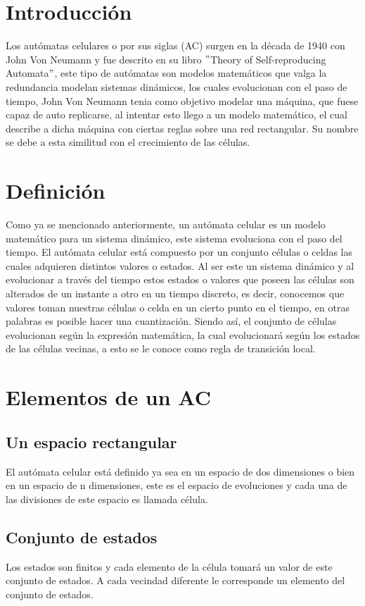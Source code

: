 \documentclass[11pt]{article}
\begin{document}
	\newpage
	
	\section{Introducción}
		Los autómatas celulares o por sus siglas (AC) surgen en la década de 1940 con John Von Neumann y fue  descrito en su libro $"$Theory of Self-reproducing Automata$"$, este tipo de autómatas son modelos matemáticos que valga la redundancia modelan sistemas dinámicos, los cuales evolucionan con el paso de tiempo, John Von Neumann tenia como objetivo modelar una máquina, que fuese capaz de auto replicarse, al intentar esto llego a un modelo matemático, el cual describe a dicha máquina con ciertas reglas sobre una red rectangular. Su nombre se debe a esta similitud con el crecimiento de las células.
	
	\section{Definición}
Como ya se mencionado anteriormente, un autómata celular es un modelo matemático para un sistema dinámico, este sistema evoluciona con el paso del tiempo. El autómata celular está compuesto por un conjunto células o celdas las cuales adquieren distintos valores o estados. Al ser este un sistema dinámico y al evolucionar a través del tiempo estos estados o valores que poseen las células son alterados de un instante a otro en un tiempo discreto, es decir, conocemos que valores toman nuestras células o celda en un cierto punto en el tiempo, en otras palabras es posible hacer una cuantización.
Siendo así, el conjunto de células evolucionan según la expresión matemática, la cual evolucionará según los estados de las células vecinas, a esto se le conoce como regla de transición local.

	
	\section{Elementos de un AC}
		\subsection{Un espacio rectangular}
		El autómata celular está definido ya sea en un espacio de dos dimensiones o bien en un espacio de n dimensiones, este es el espacio de evoluciones y cada una de las divisiones de este espacio es llamada célula.
		
		\subsection{Conjunto de estados}
		Los estados son finitos y cada elemento de la célula tomará un valor de este conjunto de estados. A cada vecindad diferente le corresponde un elemento del conjunto de estados.
 	
\end{document}

